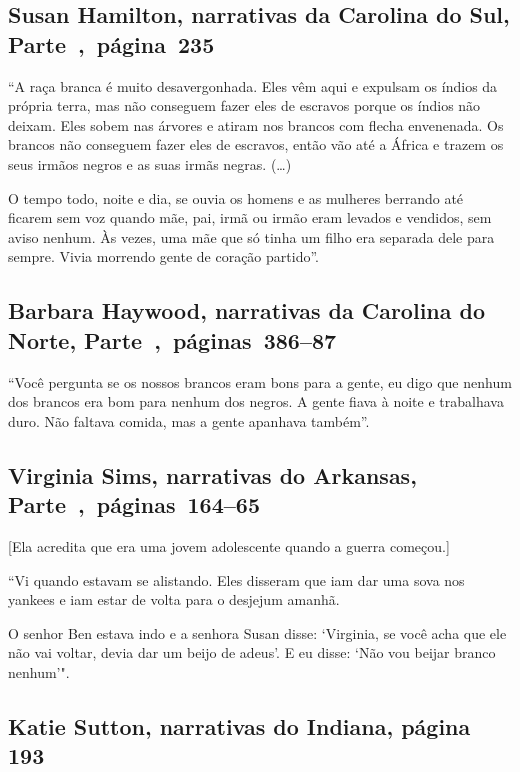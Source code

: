 \subsection{Susan Hamilton, narrativas da Carolina do Sul, Parte~,~página~235}
\label{ref120}

``A raça branca é muito desavergonhada. Eles vêm aqui e expulsam os
índios da própria terra, mas não conseguem fazer eles de escravos porque
os índios não deixam. Eles sobem nas árvores e atiram nos brancos com
flecha envenenada. Os brancos não conseguem fazer eles de escravos,
então vão até a África e trazem os seus irmãos negros e as suas irmãs
negras. (\ldots{})

O tempo todo, noite e dia, se ouvia os homens e as mulheres berrando até
ficarem sem voz quando mãe, pai, irmã ou irmão eram levados e vendidos,
sem aviso nenhum. Às vezes, uma mãe que só tinha um filho era separada
dele para sempre. Vivia morrendo gente de coração partido''.

\subsection{Barbara Haywood, narrativas da Carolina do Norte, Parte~,~páginas~386--87}
\label{ref132}

``Você pergunta se os nossos brancos eram bons para a gente, eu digo que
nenhum dos brancos era bom para nenhum dos negros. A gente fiava à noite
e trabalhava duro. Não faltava comida, mas a gente apanhava também''.

\subsection{Virginia Sims, narrativas do Arkansas, Parte~,~páginas~164--65}
\label{ref241}

{[}Ela acredita que era uma jovem adolescente quando a guerra
começou.{]}

``Vi quando estavam se alistando. Eles disseram que iam dar uma sova nos
yankees e iam estar de volta para o desjejum amanhã.

O senhor Ben estava indo e a senhora Susan disse: `Virginia, se você
acha que ele não vai voltar, devia dar um beijo de adeus'. E eu disse:
`Não vou beijar branco nenhum'".

\subsection{Katie Sutton, narrativas do Indiana, página 193}
\label{ref261}

